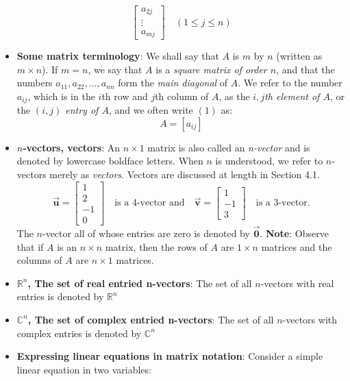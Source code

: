 \documentclass{report}
\begin{document}
\begin{itemize}
\[\begin{bmatrix}
                     a_{2j} \\
                     \vdots \\
                     a_{mj}
                 \end{bmatrix} \quad (1 \leq j \leq n)
             \]
         \item \textbf{Some matrix terminology}:
             We shall say that $A$ is $m$ by $n$ (written as $m \times n$). If $m = n$, we say that $A$ is a \textit{square matrix of order $n$}, and that the numbers $a_{11}, a_{22}, \dots, a_{nn}$ form the \textit{main diagonal} of $A$. We refer to the number $a_{ij}$, which is in the $i$th row and $j$th column of $A$, as the \textit{$i,j$th element of $A$}, or the \textit{$(i,j)$ entry of $A$}, and we often write $(1)$ as:
             \[
                 A = [a_{ij}]
             \]
         \item \textbf{$n$-vectors, vectors}:
             An $n \times 1$ matrix is also called an \textit{n-vector} and is denoted by lowercase boldface letters. When $n$ is understood, we refer to $n$-vectors merely as \textit{vectors}. Vectors are discussed at length in Section 4.1.
             \[
                 \vec{\mathbf{u}} = \begin{bmatrix} 1 \\ 2 \\ -1 \\ 0 \end{bmatrix} \quad \text{is a 4-vector and} \quad \vec{\mathbf{v}} = \begin{bmatrix} 1 \\ -1 \\ 3 \end{bmatrix} \quad \text{is a 3-vector.}
             \]
             The $n$-vector all of whose entries are zero is denoted by $\vec{\mathbf{0}}$.
             \bigbreak \noindent 
             \textbf{Note}: Observe that if $A$ is an $n \times n$ matrix, then the rows of $A$ are $1 \times n$ matrices and the columns of $A$ are $n \times 1$ matrices. 
         \item \textbf{$\mathbb{R}^{n}$, The set of real entried n-vectors}: The set of all $n$-vectors with real entries is denoted by $\mathbb{R}^{n}$
         \item \textbf{$\mathbb{C}^{n}$, The set of complex entried n-vectors}: The set of all $n$-vectors with complex entries is denoted by $\mathbb{C}^{n}$
         \item \textbf{Expressing linear equations in matrix notation}:
             Consider a simple linear equation in two variables:

\end{itemize}
\end{document}
